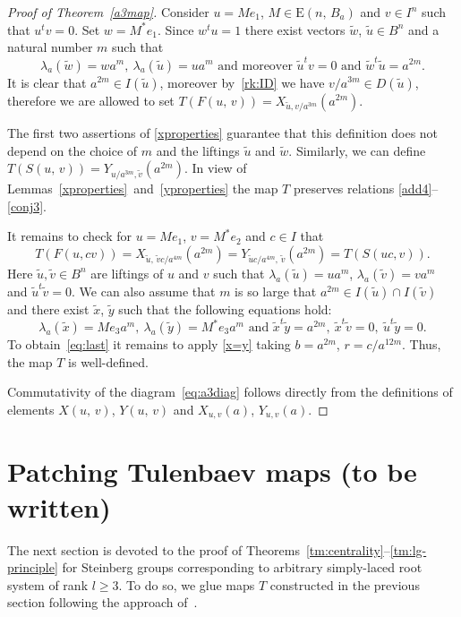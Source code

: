 \documentclass[11pt]{amsart}
\theoremstyle{plain} \declaretheorem[name=Theorem, Refname={Theorem,Theorems}]{tm} \Crefname{tm}{Theorem}{Theorems}
\numberwithin{equation}{section}
\theoremstyle{definition} \newtheorem{df}[lm]{Definition} \Crefname{df}{Definition}{Definitions}
\theoremstyle{remark} \newtheorem{rk}[lm]{Remark} \Crefname{rk}{Remark}{Remarks}
\newcommand{\E}{{\mathrm{E}}}
\begin{document}
\begin{proof}[Proof of Theorem~\ref{a3map}]
Consider $u=Me_1$, $M\in\E(n,\,B_a)$ and $v\in I^n$ such that $u^tv=0$.
Set $w=M^*e_1$. Since $w^tu=1$ there exist vectors $\tilde w$, $\tilde u\in B^n$ and a natural number $m$ such that 
$$ \lambda_a(\tilde{w})=wa^m,\ \lambda_a(\tilde{u})=ua^m\text{ and moreover }\tilde u^tv=0\text{ and }\tilde w^t\tilde u=a^{2m}.$$
It is clear that $a^{2m}\in I(\tilde u)$, moreover by~\cref{rk:ID} we have $v/a^{3m} \in D(\tilde u)$, therefore we are allowed to set $T(F(u,\,v))=X_{\tilde u,v/a^{3m}}(a^{2m})$. 

The first two assertions of \cref{xproperties} guarantee that this definition does not depend on the choice of $m$ and the liftings $\tilde u$ and $\tilde w$.
Similarly, we can define $T(S(u,\,v))=Y_{u/a^{3m},\tilde v}(a^{2m})$.
In view of Lemmas~\ref{xproperties}~and~\ref{yproperties} the map $T$ preserves relations \eqref{add4}--\eqref{conj3}.

It remains to check for $u = Me_1$, $v=M^*e_2$ and $c\in I$ that 
\begin{equation}T(F(u, cv)) = X_{\tilde u,\,\tilde v c/a^{4m}}(a^{2m}) = Y_{\tilde uc/a^{4m},\, \tilde v}(a^{2m}) = T(S(uc, v)). \label{eq:last}\end{equation}
Here $\tilde u, \tilde v \in B^n$ are liftings of $u$ and $v$ such that $\lambda_a(\tilde u)= ua^m$, $\lambda_a(\tilde v)= va^m$ and $\tilde u^t \tilde v = 0$.
We can also assume that $m$ is so large that $a^{2m}\in I(\tilde{u})\cap I(\tilde{v})$ and there exist $\tilde{x}$, $\tilde{y}$ such that the following equations hold:
$$\lambda_a(\tilde{x})=Me_3a^m,\ \lambda_a(\tilde{y})=M^*e_3a^m\text{ and }\tilde{x}^t\tilde{y}=a^{2m},\ \tilde{x}^t\tilde{v} = 0,\ \tilde{u}^t\tilde{y} =0.$$
To obtain~\eqref{eq:last} it remains to apply \cref{x=y} taking $b=a^{2m}$, $r=c/a^{12m}$.
Thus, the map $T$ is well-defined.

Commutativity of the diagram~\eqref{eq:a3diag} follows directly from the definitions of elements $X(u,\,v)$, $Y(u,\,v)$ and $X_{u,v}(a)$, $Y_{u,v}(a)$. \end{proof}

\section{Patching Tulenbaev maps (to be written)}\label{sec:patching}

The next section is devoted to the proof of Theorems~\ref{tm:centrality}--\ref{tm:lg-principle} for Steinberg groups corresponding to 
arbitrary simply-laced root system of rank $l\geq3$.
To do so, we glue maps $T$ constructed in the previous section following the approach of~\cite{SCh}.

\printbibliography
\end{document}
